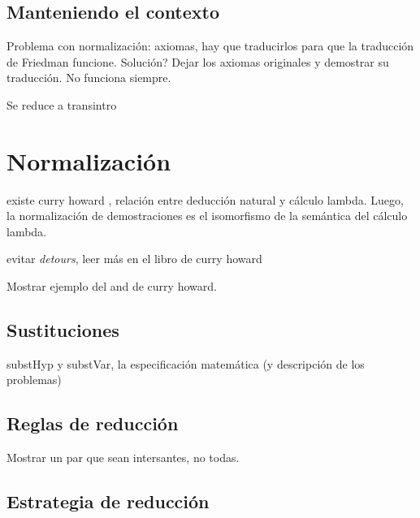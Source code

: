 \begin{lemma}
    \label{fri:lemma:dnegr-e}
\end{lemma}

\begin{lemma}
    \label{fri:lemma:trad-or-e}
\end{lemma}

\subsection{Manteniendo el contexto}

Problema con normalización: axiomas, hay que traducirlos para que la traducción de Friedman funcione. Solución? Dejar los axiomas originales y demostrar su traducción. No funciona siempre.

\begin{lemma}
    Se reduce a transintro
\end{lemma}


\section{Normalización}

existe curry howard \cite{curry-howard-isomorphism}, relación entre deducción
natural y cálculo lambda. Luego, la normalización de demostraciones es el
isomorfismo de la semántica del cálculo lambda.

evitar \textit{detours}, leer más en el libro de curry howard

Mostrar ejemplo del and de curry howard.

\subsection{Sustituciones}

substHyp y substVar, la especificación matemática (y descripción de los problemas)

\subsection{Reglas de reducción}

Mostrar un par que sean intersantes, no todas.

\subsection{Estrategia de reducción}

